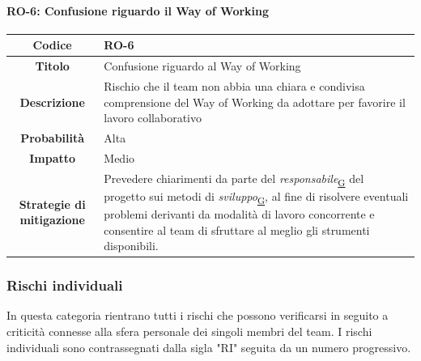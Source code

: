 \documentclass[a4paper,12pt]{article}
\begin{document}
{{            \paragraph{RO-6: Confusione riguardo il Way of Working}\mbox{}{     
                \begin{longtable}{|c|p{11cm}|}
                    \hline
                    \textbf{Codice} & RO-6 \\
                    \hline
                    \textbf{Titolo} & Confusione riguardo al Way of Working \\
                    \hline
                    \textbf{Descrizione} & Rischio che il team non abbia una chiara e condivisa comprensione del Way of Working da adottare per favorire il lavoro collaborativo \\
                    \hline
                    \textbf{Probabilità} & Alta \\
                    \hline
                    \textbf{Impatto} & Medio \\
                    \hline
                    \textbf{Strategie di mitigazione} & Prevedere chiarimenti da parte del \textit{responsabile}\textsubscript{\href{https://atlasteam9.github.io/Atlas/glossario.html\#Responsabile}{G}} del progetto sui metodi di \textit{sviluppo}\textsubscript{\href{https://atlasteam9.github.io/Atlas/glossario.html\#Sviluppo}{G}}, al fine di risolvere eventuali problemi 
                        derivanti da modalità di lavoro concorrente e consentire al team di sfruttare al meglio gli strumenti disponibili. \\
                    \hline
                \end{longtable}
            }

        \subsubsection{Rischi individuali}
        In questa categoria rientrano tutti i rischi che possono verificarsi in seguito a criticità connesse alla sfera personale dei singoli membri del team. I rischi individuali sono contrassegnati dalla sigla "RI" seguita da un numero progressivo.

}}
\end{document}
